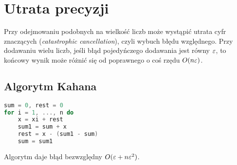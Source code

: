 \section{Utrata precyzji}
Przy odejmowaniu podobnych na wielkość liczb może wystąpić utrata cyfr znaczących \linebreak (\textit{catastrophic cancellation}), czyli wybuch błędu względnego. Przy dodawaniu wielu liczb, jeśli błąd pojedyńczego dodawania jest równy \( \varepsilon \), to końcowy wynik może różnić się od poprawnego \linebreak o coś rzędu \( O(n \varepsilon) \).

\subsection{Algorytm Kahana}
\begin{multicols}{2}
	\begin{lstlisting}[language=Cpp]
sum = 0, rest = 0
for i = 1, ..., n do
    x = xi + rest
    sum1 = sum + x
    rest = x - (sum1 - sum)
    sum = sum1
\end{lstlisting}
	\columnbreak
	Algorytm daje błąd bezwzględny \( O(\varepsilon + n\varepsilon^2) \).
\end{multicols}